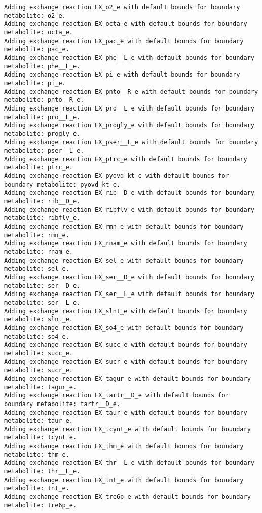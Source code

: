 \documentclass[
  letterpaper,
  DIV=11,
  numbers=noendperiod]{scrartcl}
\begin{document}
\begin{verbatim}
Adding exchange reaction EX_o2_e with default bounds for boundary metabolite: o2_e.
Adding exchange reaction EX_octa_e with default bounds for boundary metabolite: octa_e.
Adding exchange reaction EX_pac_e with default bounds for boundary metabolite: pac_e.
Adding exchange reaction EX_phe__L_e with default bounds for boundary metabolite: phe__L_e.
Adding exchange reaction EX_pi_e with default bounds for boundary metabolite: pi_e.
Adding exchange reaction EX_pnto__R_e with default bounds for boundary metabolite: pnto__R_e.
Adding exchange reaction EX_pro__L_e with default bounds for boundary metabolite: pro__L_e.
Adding exchange reaction EX_progly_e with default bounds for boundary metabolite: progly_e.
Adding exchange reaction EX_pser__L_e with default bounds for boundary metabolite: pser__L_e.
Adding exchange reaction EX_ptrc_e with default bounds for boundary metabolite: ptrc_e.
Adding exchange reaction EX_pyovd_kt_e with default bounds for boundary metabolite: pyovd_kt_e.
Adding exchange reaction EX_rib__D_e with default bounds for boundary metabolite: rib__D_e.
Adding exchange reaction EX_ribflv_e with default bounds for boundary metabolite: ribflv_e.
Adding exchange reaction EX_rmn_e with default bounds for boundary metabolite: rmn_e.
Adding exchange reaction EX_rnam_e with default bounds for boundary metabolite: rnam_e.
Adding exchange reaction EX_sel_e with default bounds for boundary metabolite: sel_e.
Adding exchange reaction EX_ser__D_e with default bounds for boundary metabolite: ser__D_e.
Adding exchange reaction EX_ser__L_e with default bounds for boundary metabolite: ser__L_e.
Adding exchange reaction EX_slnt_e with default bounds for boundary metabolite: slnt_e.
Adding exchange reaction EX_so4_e with default bounds for boundary metabolite: so4_e.
Adding exchange reaction EX_succ_e with default bounds for boundary metabolite: succ_e.
Adding exchange reaction EX_sucr_e with default bounds for boundary metabolite: sucr_e.
Adding exchange reaction EX_tagur_e with default bounds for boundary metabolite: tagur_e.
Adding exchange reaction EX_tartr__D_e with default bounds for boundary metabolite: tartr__D_e.
Adding exchange reaction EX_taur_e with default bounds for boundary metabolite: taur_e.
Adding exchange reaction EX_tcynt_e with default bounds for boundary metabolite: tcynt_e.
Adding exchange reaction EX_thm_e with default bounds for boundary metabolite: thm_e.
Adding exchange reaction EX_thr__L_e with default bounds for boundary metabolite: thr__L_e.
Adding exchange reaction EX_tnt_e with default bounds for boundary metabolite: tnt_e.
Adding exchange reaction EX_tre6p_e with default bounds for boundary metabolite: tre6p_e.

\end{verbatim}
\end{document}
